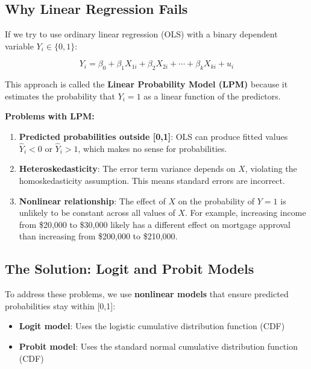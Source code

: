 \documentclass[
  12pt,
  a4paper,
]{scrbook}
\providecommand{\tightlist}{%
  \setlength{\itemsep}{0pt}\setlength{\parskip}{0pt}}
\renewcommand{\tightlist}{\setlength{\itemsep}{0.5\baselineskip}\setlength{\parskip}{0.2\baselineskip}}
\theoremstyle{plain}
\theoremstyle{definition}
\theoremstyle{remark}
\begin{document}
\subsection{Why Linear Regression
Fails}\label{why-linear-regression-fails}

If we try to use ordinary linear regression (OLS) with a binary
dependent variable \(Y_i \in \{0,1\}\):

\[
Y_i = \beta_0 + \beta_1 X_{1i} + \beta_2 X_{2i} + \cdots + \beta_k X_{ki} + u_i
\]

This approach is called the \textbf{Linear Probability Model (LPM)}
because it estimates the probability that \(Y_i = 1\) as a linear
function of the predictors.

\textbf{Problems with LPM:}

\begin{enumerate}
\def\labelenumi{\arabic{enumi}.}
\item
  \textbf{Predicted probabilities outside {[}0,1{]}}: OLS can produce
  fitted values \(\hat{Y}_i < 0\) or \(\hat{Y}_i > 1\), which makes no
  sense for probabilities.
\item
  \textbf{Heteroskedasticity}: The error term variance depends on \(X\),
  violating the homoskedasticity assumption. This means standard errors
  are incorrect.
\item
  \textbf{Nonlinear relationship}: The effect of \(X\) on the
  probability of \(Y=1\) is unlikely to be constant across all values of
  \(X\). For example, increasing income from {\$20,000} to {\$30,000}
  likely has a different effect on mortgage approval than increasing
  from {\$200,000} to {\$210,000}.
\end{enumerate}

\subsection{The Solution: Logit and Probit
Models}\label{the-solution-logit-and-probit-models}

To address these problems, we use \textbf{nonlinear models} that ensure
predicted probabilities stay within {[}0,1{]}:

\begin{itemize}
\tightlist
\item
  \textbf{Logit model}: Uses the logistic cumulative distribution
  function (CDF)
\item
  \textbf{Probit model}: Uses the standard normal cumulative
  distribution function (CDF)
\end{itemize}
\end{document}
